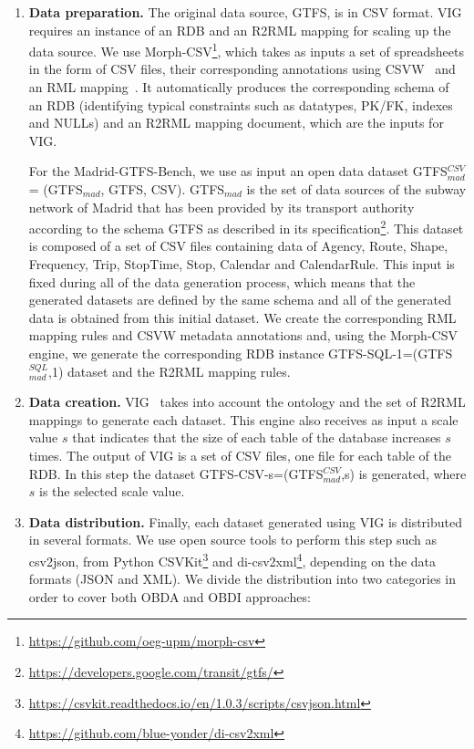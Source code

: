 \begin{enumerate}[label=\textbf{\arabic*})]
    \item \textbf{Data preparation.} The original data source, GTFS, is in CSV format. VIG requires an instance of an RDB and an R2RML mapping for scaling up the data source. We use Morph-CSV\footnote{\url{https://github.com/oeg-upm/morph-csv}}, which takes as inputs a set of spreadsheets in the form of CSV files, their corresponding annotations using CSVW~\citep{tennison2015model} and an RML mapping~\citep{dimou2014rml}. It automatically produces the corresponding schema of an RDB (identifying typical constraints such as datatypes, PK/FK, indexes and NULLs) and an R2RML mapping document, which are the inputs for VIG. 
    
    For the Madrid-GTFS-Bench, we use as input an open data dataset GTFS$_{mad}^{CSV}$ = (GTFS$_{mad}$, GTFS, CSV). GTFS$_{mad}$ is the set of data sources of the subway network of Madrid that has been provided by its transport authority according to the schema GTFS as described in its specification\footnote{\url{https://developers.google.com/transit/gtfs/}}. This dataset is composed of a set of CSV files containing data of Agency, Route, Shape, Frequency, Trip, StopTime, Stop, Calendar and CalendarRule. This input is fixed during all of the data generation process, which means that the generated datasets are defined by the same schema and all of the generated data is obtained from this initial dataset. We create the corresponding RML mapping rules and CSVW metadata annotations and, using the Morph-CSV engine, we generate the corresponding RDB instance GTFS-SQL-1=(GTFS$_{mad}^{SQL}$,1) dataset and the R2RML mapping rules.
    
    \item \textbf{Data creation.} VIG~\citep{lantivig} takes into account the ontology and the set of R2RML mappings to generate each dataset. This engine also receives as input a scale value $s$ that indicates that the size of each table of the database increases $s$ times. The output of VIG is a set of CSV files, one file for each table of the RDB. In this step the dataset GTFS-CSV-s=(GTFS$_{mad}^{CSV}$,s) is generated, where $s$ is the selected scale value.
    
    \item \textbf{Data distribution.} Finally, each dataset generated using VIG is distributed in several formats. We use open source tools to perform this step such as csv2json, from Python CSVKit\footnote{\url{https://csvkit.readthedocs.io/en/1.0.3/scripts/csvjson.html}} and di-csv2xml\footnote{\url{https://github.com/blue-yonder/di-csv2xml}}, depending on the data formats (JSON and XML). We divide the distribution into two categories in order to cover both OBDA and OBDI approaches: 
    

\end{enumerate}
